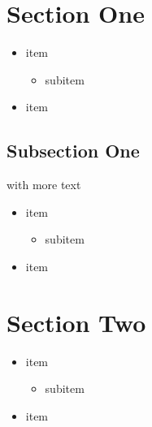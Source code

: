 \section{Section One}
\begin{frame}[fragile]{\insertsection}{}
  \begin{itemize}
    \item item
    \begin{itemize}
      \item subitem
    \end{itemize}
    \item item
  \end{itemize}
\end{frame}

\subsection{Subsection One}
\begin{frame}[fragile]{\insertsection with more text}{\insertsubsection}
  \begin{itemize}
    \item item
    \begin{itemize}
      \item subitem
    \end{itemize}
    \item item
  \end{itemize}
\end{frame}

\section{Section Two}
\begin{frame}[fragile]{\insertsection}{\insertsubsection}
  \begin{itemize}
    \item item
    \begin{itemize}
      \item subitem
    \end{itemize}
    \item item
  \end{itemize}
\end{frame}